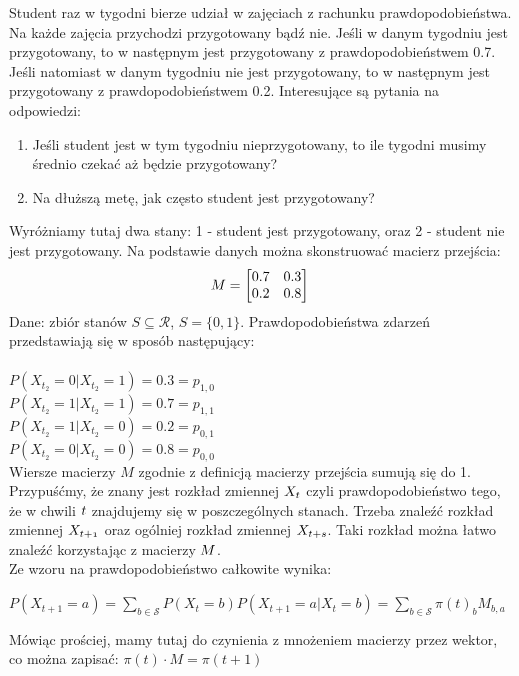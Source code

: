 \begin{przyklad}
	Student raz w tygodni bierze udział w zajęciach z rachunku prawdopodobieństwa. Na każde zajęcia przychodzi przygotowany bądź nie. Jeśli w danym tygodniu jest przygotowany, to w następnym jest przygotowany z prawdopodobieństwem 0.7. Jeśli natomiast w danym tygodniu nie jest przygotowany, to w następnym jest przygotowany z prawdopodobieństwem 0.2. Interesujące są pytania na odpowiedzi:
	
	\begin{enumerate}
		\item Jeśli student jest w tym tygodniu nieprzygotowany, to ile tygodni musimy średnio czekać aż będzie przygotowany?
		\item Na dłuższą metę, jak często student jest przygotowany?
	\end{enumerate}
	
	Wyróżniamy tutaj dwa stany: 1 - student jest przygotowany, oraz 2 - student nie jest przygotowany. Na podstawie danych można skonstruować macierz przejścia:\newline
	\[
	M = 
	\begin{bmatrix}
		0.7 & 0.3 \\
		0.2 & 0.8 
	\end{bmatrix}\\
	\]
	Dane: zbiór stanów $S \subseteq \mathcal{R}$, $S = \{0,1\} $. Prawdopodobieństwa zdarzeń przedstawiają się w sposób następujący: \\ \\ 
	$P(X_{t_{2}} = 0 | X_{t_{2}} = 1) = 0.3 = p_{1,0}$ \\
	$P(X_{t_{2}} = 1 | X_{t_{2}} = 1) = 0.7 = p_{1,1}$ \\
	$P(X_{t_{2}} = 1 | X_{t_{2}} = 0) = 0.2 = p_{0,1}$ \\
	$P(X_{t_{2}} = 0 | X_{t_{2}} = 0) = 0.8 = p_{0,0}$ \\
		
	Wiersze macierzy $M$ zgodnie z definicją macierzy przejścia sumują się do 1. 
	Przypuśćmy, że znany jest rozkład zmiennej $\mathnormal{X_{t}}$ czyli prawdopodobieństwo tego, że w chwili $\mathnormal{t}$ znajdujemy się w poszczególnych stanach. Trzeba znaleźć rozkład zmiennej $\mathnormal{X_{t+1}}$ oraz ogólniej rozkład zmiennej $\mathnormal{X_{t+s}}$. Taki rozkład można łatwo znaleźć korzystając z macierzy $\mathnormal{M}$. \\
	Ze wzoru na prawdopodobieństwo całkowite wynika:
	\begin{center}
		$P(X_{t+1} = a) = \sum_{b \in \mathcal{S}} P(X_{t} = b)P(X_{t+1} = a | X_{t} = b) = \sum_{b \in \mathcal{S}} \pi(t)_{b} M_{b,a}$
	\end{center}
	Mówiąc prościej, mamy tutaj do czynienia z mnożeniem macierzy przez wektor, co można zapisać: $\pi(t) \cdot M = \pi(t+1)$
	
\end{przyklad}

